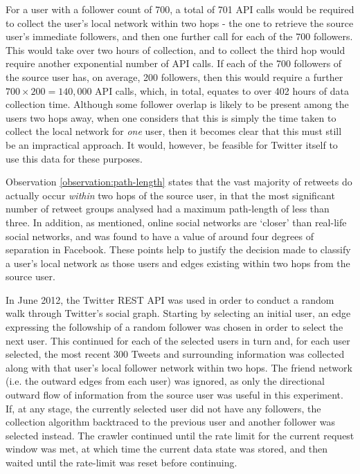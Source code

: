 For a user with a follower count of 700, a total of 701 API calls would be required to collect the user's local network within two hops - the one to retrieve the source user's immediate followers, and then one further call for each of the 700 followers. This would take over two hours of collection, and to collect the third hop would require another exponential number of API calls. If each of the 700 followers of the source user has, on average, 200 followers, then this would require  a further $700 \times 200 = 140,000$ API calls, which, in total, equates to over 402 hours of data collection time. Although some follower overlap is likely to be present among the users two hops away, when one considers that this is simply the time taken to collect the local network for \textit{one} user, then it becomes clear that this must still be an impractical approach. It would, however, be feasible for Twitter itself to use this data for these purposes.

Observation \ref{observation:path-length} states that the vast majority of retweets do actually occur \textit{within} two hops of the source user, in that the most significant number of retweet groups analysed had a maximum path-length of less than three. In addition, as mentioned, online social networks are `closer' than real-life social networks, and was found to have a value of around four degrees of separation in Facebook. These points help to justify the decision made to classify a user's local network as those users and edges existing within two hops from the source user.

In June 2012, the Twitter REST API was used in order to conduct a random walk through Twitter's social graph. Starting by selecting an initial user, an edge expressing the followship of a random follower was chosen in order to select the next user. This continued for each of the selected users in turn and, for each user selected, the most recent 300 Tweets and surrounding information was collected along with that user's local follower network within two hops. The friend network (i.e. the outward edges from each user) was ignored, as only the directional outward flow of information from the source user was useful in this experiment. If, at any stage, the currently selected user did not have any followers, the collection algorithm backtraced to the previous user and another follower was selected instead. The crawler continued until the rate limit for the current request window was met, at which time the current data state was stored, and then waited until the rate-limit was reset before continuing.

